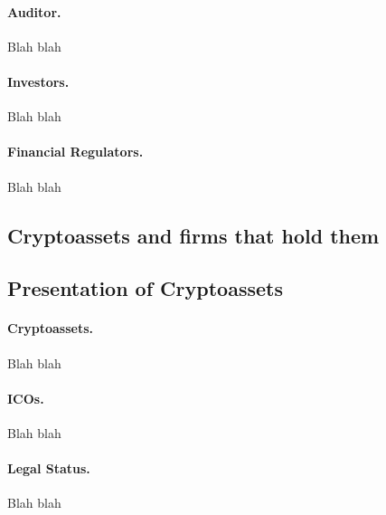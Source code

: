 \paragraph{Auditor.}  Blah blah



\paragraph{Investors.}  Blah blah

\paragraph{Financial Regulators.}  Blah blah

\subsection{Cryptoassets and firms that hold them}




\subsection{Presentation of Cryptoassets}


\paragraph{Cryptoassets.}  Blah blah



\paragraph{ICOs.}  Blah blah



\paragraph{Legal Status.}  Blah blah



\
